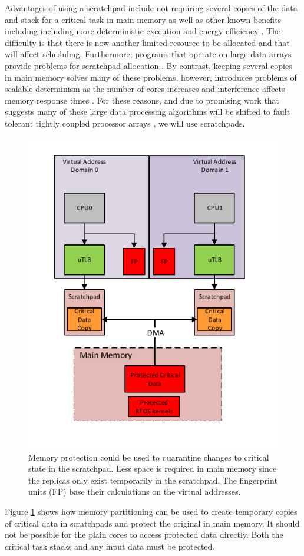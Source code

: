 	Advantages of using a scratchpad include not requiring several copies of the data and stack for a critical task in main memory as well as other known benefits including including more deterministic execution \cite{suhendra2005wcet} and energy efficiency \cite{steinke2002assigning}. 
	The difficulty is that there is now another limited resource to be allocated and that will affect scheduling. Furthermore, programs that operate on large data arrays provide problems for scratchpad allocation \cite{francesco2004integrated}. 
	By contrast, keeping several copies in main memory solves many of these problems, however, introduces problems of scalable determinism as the number of cores increases and interference affects memory response times \cite{abel2013impact}. 
	For these reasons, and due to promising work that suggests many of these large data processing algorithms will be shifted to fault tolerant tightly coupled processor arrays \cite{nelis2014challenge,lari2014massively,ferreira2014adaptive}, we will use scratchpads.
	\begin{figure}[h]
\centering
\includegraphics[scale=1]{Figures/sor}
\caption[Memory protection and fault containment]{Memory protection could be used to quarantine changes to critical state in the scratchpad. Less space is required in main memory since the replicas only exist temporarily in the scratchpad. The fingerprint units (FP) base their calculations on the virtual addresses.}
\label{f:sor}
\end{figure}
	Figure \ref{f:sor} shows how memory partitioning can be used to create temporary copies of critical data in scratchpads and protect the original in main memory. It should not be possible for the plain cores to access protected data directly.
	Both the critical task stacks and any input data must be protected.
	
